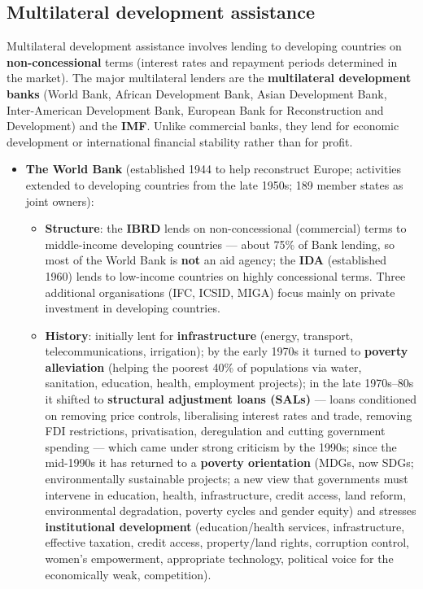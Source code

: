 \subsection{Multilateral development assistance}
Multilateral development assistance involves lending to developing countries on \textbf{non-concessional} terms (interest rates and repayment periods determined in the market). The major multilateral lenders are the \textbf{multilateral development banks} (World Bank, African Development Bank, Asian Development Bank, Inter-American Development Bank, European Bank for Reconstruction and Development) and the \textbf{IMF}. Unlike commercial banks, they lend for economic development or international financial stability rather than for profit.
\begin{itemize}
  \item \textbf{The World Bank} (established 1944 to help reconstruct Europe; activities extended to developing countries from the late 1950s; 189 member states as joint owners):
  \begin{itemize}
    \item \textbf{Structure}: the \textbf{IBRD} lends on non-concessional (commercial) terms to middle-income developing countries --- about 75\% of Bank lending, so most of the World Bank is \textbf{not} an aid agency; the \textbf{IDA} (established 1960) lends to low-income countries on highly concessional terms. Three additional organisations (IFC, ICSID, MIGA) focus mainly on private investment in developing countries.
    \item \textbf{History}: initially lent for \textbf{infrastructure} (energy, transport, telecommunications, irrigation); by the early 1970s it turned to \textbf{poverty alleviation} (helping the poorest 40\% of populations via water, sanitation, education, health, employment projects); in the late 1970s--80s it shifted to \textbf{structural adjustment loans (SALs)} --- loans conditioned on removing price controls, liberalising interest rates and trade, removing FDI restrictions, privatisation, deregulation and cutting government spending --- which came under strong criticism by the 1990s; since the mid-1990s it has returned to a \textbf{poverty orientation} (MDGs, now SDGs; environmentally sustainable projects; a new view that governments must intervene in education, health, infrastructure, credit access, land reform, environmental degradation, poverty cycles and gender equity) and stresses \textbf{institutional development} (education/health services, infrastructure, effective taxation, credit access, property/land rights, corruption control, women's empowerment, appropriate technology, political voice for the economically weak, competition).

\end{itemize}
\end{itemize}
